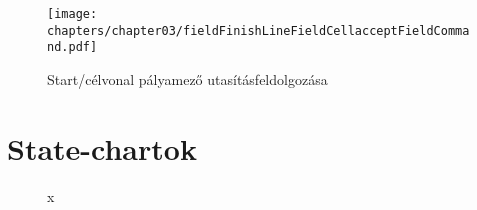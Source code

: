 \begin{figure}[h]
	\begin{center}
		\texttt{[image: chapters/chapter03/fieldFinishLineFieldCellacceptFieldCommand.pdf]}
		\caption{Start/célvonal pályamező utasításfeldolgozása}
		\label{fig:field.FinishLineFieldCell.accept}
	\end{center}
\end{figure}

\clearpage

\section{State-chartok}

\begin{figure}[h]
\begin{center}
\caption{x}
\label{fig:example3}
\end{center}
\end{figure}

